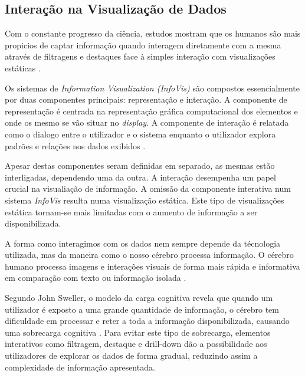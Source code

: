 \subsection{Interação na Visualização de Dados} %
\label{sub:elem_int}

Com o constante progresso da ciência, estudos mostram que os humanos são mais propicios de captar informação quando interagem diretamente com a mesma através de filtragens e destaques face à simples interação com visualizações estáticas \cite{heer2012interactive}. 

Os sistemas de \textit{Information Visualization (InfoVis)} são compostos essencialmente por duas componentes principais: representação e interação. A componente de representação é centrada na representação gráfica computacional dos elementos e onde os mesmo se vão situar no \textit{display}. A componente de interação é relatada como o dialogo entre o utilizador e o sistema enquanto o utilizador explora padrões e relações nos dados exibidos \cite{yi2007toward}. 

Apesar destas componentes seram definidas em separado, as mesmas estão interligadas, dependendo uma da outra. A interação desempenha um papel crucial na visualiação de informação. A omissão da componente interativa num sistema \textit{InfoVis} resulta numa visualização estática. Este tipo de visualizações estática tornam-se mais limitadas com o aumento de informação a ser disponibilizada.

A forma como interagimos com os dados nem sempre depende da técnologia utilizada, mas da maneira como o nosso cérebro processa informação. O cérebro humano processa imagens e interações visuais de forma mais rápida e informativa em comparação com texto ou informação isolada \cite{ware2019information}.

Segundo John Sweller, o modelo da carga cognitiva revela que quando um utilizador é exposto a uma grande quantidade de informação, o cérebro tem dificuldade em processar e reter a toda a informação disponibilizada, causando uma sobrecarga cognitiva \cite{sweller1988cognitive}. Para evitar este tipo de sobrecarga, elementos interativos como filtragem, destaque e drill-down dão a possibilidade aos utilizadores de explorar os dados de forma gradual, reduzindo assim a complexidade de informação apresentada.

